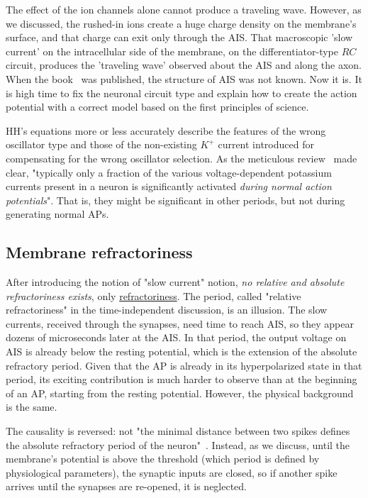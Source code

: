 The effect of the ion channels alone
cannot produce a traveling wave. However, as we discussed, the rushed-in ions
create a huge charge density on the membrane's surface, and that charge can exit only
through the 
AIS. That macroscopic 'slow current' on the intracellular side of the membrane,
on the differentiator-type $RC$ circuit, produces the 'traveling wave'
observed about the
AIS and along the axon.
When the book~\cite{MolecularBiology:2002} was published, the structure of 
AIS  \cite{AxonInitialSegmentStructure:2018} was not known.
Now it is. 
It is high time to fix the neuronal circuit type and explain how to create the action potential with a correct model based on the first principles of science.

HH's equations more or less accurately describe 
the features of the wrong oscillator type and those of the
non-existing $K^+$ current introduced for compensating for the wrong oscillator selection.
As the meticulous review~\cite{BeanActionPotential:2007} made clear, "typically only a fraction of the various
voltage-dependent potassium currents present in a
neuron is significantly activated \textit{during normal action
	potentials}". That is, they might be significant in other periods, but not during generating normal 
	APs.


\subsection{Membrane refractoriness\label{sec:Physiology-FallaciesRefractoriness}}

After introducing the notion of "slow current" notion,
\textit{no relative and absolute refractoriness exists}, only \href{href="https://neuronaldynamics.epfl.ch/online/Ch2.S2.html}{refractoriness}.
The period,
called "relative refractoriness" in the time-independent discussion,
is an illusion. 
The slow currents, received through the synapses, need time to reach
\gls{AIS}, so they  appear
dozens of microseconds later at the \gls{AIS}.
In that period, the output voltage on \gls{AIS}
is already below the resting potential,
which is the extension of the absolute
refractory period. 
Given that the \gls{AP} is already in its
hyperpolarized state in that period,  
its exciting contribution is much harder to observe
than at the beginning of an \gls{AP}, starting from
the resting potential. However, the physical background is the same.

The causality is reversed:
not "the minimal distance between two spikes defines the absolute refractory period
of the neuron"~\cite{NeuralDynamicsGertsner:2014}. Instead, as we discuss, until the membrane's potential
is above the threshold (which period is defined by physiological parameters),
the synaptic inputs are closed, so if another spike arrives until
the synapses are re-opened, it is neglected. 

